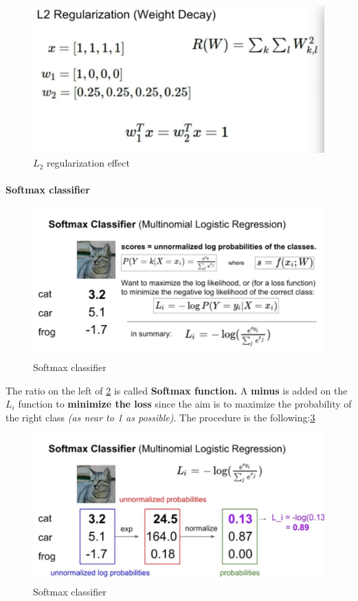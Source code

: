 \documentclass[11pt]{article}
\begin{document}
\begin{figure}[h]
\centering
\captionsetup{justification=centering}
\includegraphics[width=0.75\linewidth]{L213.pdf}
\caption{ $L_2$ regularization effect}
\label{fig:L213}
\end{figure}
\clearpage

\paragraph{Softmax classifier}
\begin{figure}[h]
\centering
\captionsetup{justification=centering}
\includegraphics[width=0.75\linewidth]{L214.pdf}
\caption{ Softmax classifier}
\label{fig:L214}
\end{figure}
The ratio on the left of \ref{fig:L214} is called \textbf{Softmax function.}
A\textbf{ minus} is added on the $L_i $ function to \textbf{minimize the loss} since the aim is to maximize the probability of the right class \textit{(as near to 1 as possible)}. The procedure is the following:\ref{fig:L215}
\begin{figure}[h]
\centering
\captionsetup{justification=centering}
\includegraphics[width=0.75\linewidth]{L215.pdf}
\caption{ Softmax classifier}
\label{fig:L215}
\end{figure}
\end{document}
